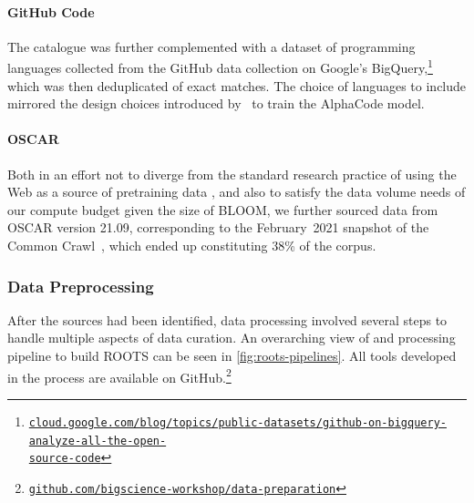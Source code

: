 \paragraph{GitHub Code} The catalogue was further complemented with a dataset of programming languages collected from the GitHub data collection on Google's BigQuery,\footnote{\href{https://cloud.google.com/blog/topics/public-datasets/github-on-bigquery-analyze-all-the-open-source-code}{{\texttt{cloud.google.com/blog/topics/public-datasets/github-on-bigquery-analyze-all-the-open-\\source-code}}}} which was then deduplicated of exact matches. The choice of languages to include mirrored the design choices introduced by~\citet{alphacode} to train the AlphaCode model.

\paragraph{OSCAR} Both in an effort not to diverge from the standard research practice of using the Web as a source of pretraining data \citep{radford2018improving,raffel2020exploring}, and also to satisfy the data volume needs of our compute budget given the size of BLOOM, we further sourced data from OSCAR version 21.09, corresponding to the February~2021 snapshot of the Common Crawl~\citep{OSCAR,AbadjiOrtizSuarezRomaryetal2021}, which ended up constituting 38\% of the corpus. 

\subsubsection{Data Preprocessing}
\label{sec:data-processing}

After the sources had been identified, data processing involved several steps to handle multiple aspects of data curation. An overarching view of and processing pipeline to build ROOTS can be seen in \ref{fig:roots-pipelines}. All tools developed in the process are available on GitHub.\footnote{\href{https://github.com/bigscience-workshop/data-preparation}{\texttt{github.com/bigscience-workshop/data-preparation}}}

